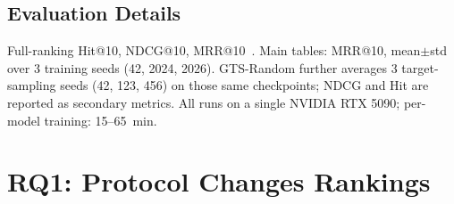 \documentclass[sigconf,natbib=true,anonymous]{acmart}
\begin{document}
\subsection{Evaluation Details}

Full-ranking Hit@10, NDCG@10, MRR@10~\cite{krichene2020sampledmetrics}.
Main tables: MRR@10, mean$\pm$std over 3 training seeds (42, 2024, 2026).
GTS-Random further averages 3 target-sampling seeds (42, 123, 456) on those same checkpoints; NDCG and Hit are reported as secondary metrics.
All runs on a single NVIDIA RTX 5090; per-model training: 15--65~min.

\section{RQ1: Protocol Changes Rankings}
\label{sec:rq1}
\end{document}
